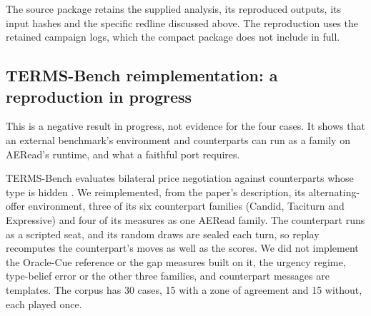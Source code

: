 The source package retains the supplied analysis, its reproduced outputs, its input hashes and the specific redline
discussed above. The reproduction uses the retained campaign logs, which the compact package does not include in
full.

\subsection{TERMS-Bench reimplementation: a reproduction in progress}\label{terms-bench-reimplementation-a-reproduction-in-progress}

This is a negative result in progress, not evidence for the four cases. It shows that an external benchmark's
environment and counterparts can run as a family on AERead's runtime, and what a faithful port requires.

TERMS-Bench evaluates bilateral price negotiation against counterparts whose type is hidden \citep{zhang2026termsbench}. We reimplemented,
from the paper's description, its alternating-offer environment, three of its six counterpart families (Candid,
Taciturn and Expressive) and four of its measures as one AERead family. The counterpart runs as a scripted seat, and
its random draws are sealed each turn, so replay recomputes the counterpart's moves as well as the scores. We did not
implement the Oracle-Cue reference or the gap measures built on it, the urgency regime, type-belief error or the other
three families, and counterpart messages are templates. The corpus has 30 cases, 15 with a zone of agreement and 15
without, each played once.

